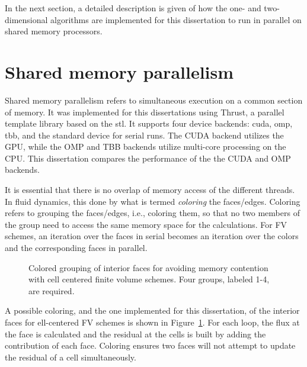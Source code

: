 In the next section, a detailed description is given of how the one- and two-dimensional algorithms are implemented for this dissertation to run in parallel on shared memory processors.

\section[Shared memory parallelism]{Shared memory parallelism}
\label{sec:shared_memory}

Shared memory parallelism refers to simultaneous execution on a common section of memory.  It was implemented for this dissertations using Thrust, a \cpp  parallel template library based on the \gls{stl}.  It supports four device backends: \gls{cuda}, \gls{omp}, \gls{tbb}, and the standard \cpp device for serial runs.  The CUDA backend utilizes the GPU, while the OMP and TBB backends utilize multi-core processing on the CPU.  This dissertation compares the performance of the the CUDA and OMP backends.

It is essential that there is no overlap of memory access of the different threads.  In fluid dynamics, this done by what is termed \emph{coloring} the faces/edges.  Coloring refers to grouping the faces/edges, i.e., coloring them, so that no two members of the group need to access the same memory space for the calculations.  For FV schemes, an iteration over the faces in serial becomes an iteration over the colors and the corresponding faces in parallel. 

\begin{figure}[htbp]
\begin{center}

\end{center}
\caption{Colored grouping of interior faces for avoiding memory contention with cell centered finite volume schemes.  Four groups, labeled 1-4, are required.}
\label{fig:face_color_1}
\end{figure}

A possible coloring, and the one implemented for this dissertation, of the interior faces for ell-centered FV schemes is shown in Figure~\ref{fig:face_color_1}.  For each loop, the flux at the face is calculated and the residual at the cells is built by adding the contribution of each face.  Coloring ensures two faces will not attempt to update the residual of a cell simultaneously.

